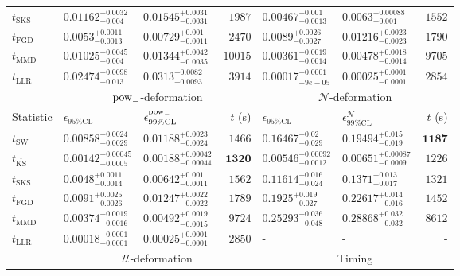 \begin{tabular}{l|llr|llr}
	$t_{\mathrm{SKS}}$ & $0.01162_{-0.004}^{+0.0032}$ & $0.01545_{-0.0031}^{+0.0031}$ & $1987$ & $0.00467_{-0.0013}^{+0.001}$ & $0.0063_{-0.001}^{+0.00088}$ & $1552$ \\
	$t_{\mathrm{FGD}}$ & ${\mathbf{0.0053_{-0.0013}^{+0.0011}}}$ & ${\mathbf{0.00729_{-0.0011}^{+0.001}}}$ & $2470$ & $0.0089_{-0.0027}^{+0.0026}$ & $0.01216_{-0.0023}^{+0.0023}$ & $1790$ \\
	$t_{\mathrm{MMD}}$ & $0.01025_{-0.004}^{+0.0045}$ & $0.01344_{-0.0035}^{+0.0042}$ & $10015$ & $0.00361_{-0.0014}^{+0.0019}$ & $0.00478_{-0.0014}^{+0.0018}$ & $9705$ \\
	$t_{\mathrm{LLR}}$ & $0.02474_{-0.013}^{+0.0098}$ & $0.0313_{-0.0093}^{+0.0082}$ & $3914$ & $0.00017_{-9e-05}^{+0.0001}$ & $0.00025_{-0.0001}^{+0.0001}$ & $2854$ \\
	\toprule
	\multicolumn{1}{c}{} & \multicolumn{3}{c}{$\rm{pow}_{-}$-deformation} & \multicolumn{3}{c}{$\mathcal{N}$-deformation} \\
	Statistic & $\epsilon_{95\%\mathrm{CL}}$ & $\epsilon^  {\rm{pow}_{-}}_{99\%\mathrm{CL}}$ & $t$ (s) & $\epsilon_{95\%\mathrm{CL}}$ & $\epsilon^    {\mathcal{N}}_{99\%\mathrm{CL}}$ & $t$ (s) \\
	\midrule
	$t_{\mathrm{SW}}$ & $0.00858_{-0.0029}^{+0.0024}$ & $0.01188_{-0.0024}^{+0.0023}$ & $1466$ & $0.16467_{-0.029}^{+0.02}$ & $0.19494_{-0.019}^{+0.015}$ & ${\mathbf{1187}}$ \\
	$t_{\overline{\mathrm{KS}}}$ & ${\mathbf{0.00142_{-0.0005}^{+0.00045}}}$ & ${\mathbf{0.00188_{-0.00044}^{+0.00042}}}$ & ${\mathbf{1320}}$ & ${\mathbf{0.00546_{-0.0012}^{+0.00092}}}$ & ${\mathbf{0.00651_{-0.0009}^{+0.00087}}}$ & $1226$ \\
	$t_{\mathrm{SKS}}$ & $0.0048_{-0.0014}^{+0.0011}$ & $0.00642_{-0.0011}^{+0.001}$ & $1562$ & $0.11614_{-0.024}^{+0.016}$ & $0.1371_{-0.017}^{+0.013}$ & $1321$ \\
	$t_{\mathrm{FGD}}$ & $0.0091_{-0.0026}^{+0.0025}$ & $0.01247_{-0.0022}^{+0.0022}$ & $1789$ & $0.1925_{-0.027}^{+0.019}$ & $0.22617_{-0.016}^{+0.014}$ & $1452$ \\
	$t_{\mathrm{MMD}}$ & $0.00374_{-0.0016}^{+0.0019}$ & $0.00492_{-0.0015}^{+0.0019}$ & $9724$ & $0.25293_{-0.048}^{+0.036}$ & $0.28868_{-0.032}^{+0.032}$ & $8612$ \\
	$t_{\mathrm{LLR}}$ & $0.00018_{-0.0001}^{+0.0001}$ & $0.00025_{-0.0001}^{+0.0001}$ & $2850$ & - & - & - \\
	\toprule
	\multicolumn{1}{c}{} & \multicolumn{3}{c}{$\mathcal{U}$-deformation} & \multicolumn{3}{c}{Timing} \\

\end{tabular}
